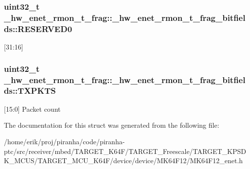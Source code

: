 \subsubsection[{\texorpdfstring{R\+E\+S\+E\+R\+V\+E\+D0}{RESERVED0}}]{\setlength{\rightskip}{0pt plus 5cm}uint32\+\_\+t \+\_\+hw\+\_\+enet\+\_\+rmon\+\_\+t\+\_\+frag\+::\+\_\+hw\+\_\+enet\+\_\+rmon\+\_\+t\+\_\+frag\+\_\+bitfields\+::\+R\+E\+S\+E\+R\+V\+E\+D0}\hypertarget{struct__hw__enet__rmon__t__frag_1_1__hw__enet__rmon__t__frag__bitfields_a8a014499f95112fe49e0794c2cba68cd}{}\label{struct__hw__enet__rmon__t__frag_1_1__hw__enet__rmon__t__frag__bitfields_a8a014499f95112fe49e0794c2cba68cd}
\mbox{[}31\+:16\mbox{]} 
\subsubsection[{\texorpdfstring{T\+X\+P\+K\+TS}{TXPKTS}}]{\setlength{\rightskip}{0pt plus 5cm}uint32\+\_\+t \+\_\+hw\+\_\+enet\+\_\+rmon\+\_\+t\+\_\+frag\+::\+\_\+hw\+\_\+enet\+\_\+rmon\+\_\+t\+\_\+frag\+\_\+bitfields\+::\+T\+X\+P\+K\+TS}\hypertarget{struct__hw__enet__rmon__t__frag_1_1__hw__enet__rmon__t__frag__bitfields_aa5399efae22951506e5fcdcbc06493ae}{}\label{struct__hw__enet__rmon__t__frag_1_1__hw__enet__rmon__t__frag__bitfields_aa5399efae22951506e5fcdcbc06493ae}
\mbox{[}15\+:0\mbox{]} Packet count 

The documentation for this struct was generated from the following file\+:\begin{DoxyCompactItemize}
\item 
/home/erik/proj/piranha/code/piranha-\/ptc/src/receiver/mbed/\+T\+A\+R\+G\+E\+T\+\_\+\+K64\+F/\+T\+A\+R\+G\+E\+T\+\_\+\+Freescale/\+T\+A\+R\+G\+E\+T\+\_\+\+K\+P\+S\+D\+K\+\_\+\+M\+C\+U\+S/\+T\+A\+R\+G\+E\+T\+\_\+\+M\+C\+U\+\_\+\+K64\+F/device/device/\+M\+K64\+F12/M\+K64\+F12\+\_\+enet.\+h\end{DoxyCompactItemize}
